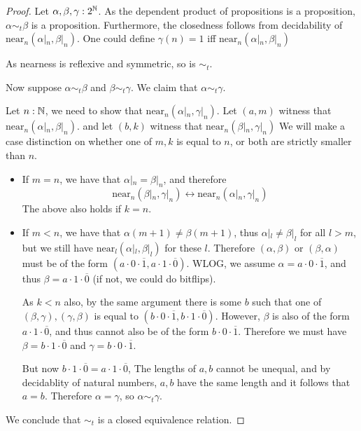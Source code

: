 \begin{proof}
   Let $\alpha, \beta, \gamma : 2^{\mathbb{N}}$. 
   As the dependent product of propositions is a proposition, $\alpha \sim_t\beta$ is a proposition. 
   Furthermore, the closedness follows from decidability of $\text{near}_n(\alpha|_n, \beta|_n)$. 
   One could define $\gamma(n) = 1$ iff $\text{near}_n(\alpha|_n, \beta|_n)$
   
   As nearness is reflexive and symmetric, so is $\sim_t$. 

   Now suppose $\alpha \sim_t \beta$ and $\beta\sim_t \gamma$. 
   We claim that $\alpha \sim_t \gamma$. 

   Let $n:\mathbb{N}$, we need to show that 
   $\text{near}_n(\alpha|_n , \gamma|_n)$. 
   Let $(a,m)$ witness that $\text{near}_n(\alpha|_n, \beta|_n)$.
   and let $(b, k)$ witness that $\text{near}_n(\beta|_n, \gamma|_n)$
   We will make a case distinction on whether one of $m,k$ is equal to $n$, or
   both are strictly smaller than $n$. 
   \begin{itemize}
     \item 
       If $m=n$, we have that $\alpha|_n = \beta|_n$, and therefore 
       \begin{equation}
         \text{near}_n(\beta|_n, \gamma|_n) \leftrightarrow \text{near}_n(\alpha|_n, \gamma|_n)
       \end{equation} 
       The above also holds if $k = n$.
     \item 
       If $m< n$, we have that $\alpha(m+1) \neq \beta(m+1)$, thus 
       $\alpha|_l \neq \beta|_l$ for all $l>m$, 
       but we still have $\text{near}_l(\alpha|_l, \beta|_l)$ for these $l$. 
       Therefore $(\alpha, \beta)$ or $(\beta, \alpha)$ must be of the form
       $(a \cdot 0 \cdot \overline 1, a \cdot 1 \cdot \overline 0)$. 
       WLOG, we assume $\alpha = a \cdot 0 \cdot \overline 1$, and thus 
       $\beta = a \cdot 1 \cdot \overline 0$ (if not, we could do bitflips). 

       As $k<n$ also, by the same argument there is some $b$ such that one of 
       $(\beta,\gamma), (\gamma, \beta)$
       is equal to $(b\cdot 0 \cdot \overline 1, b \cdot 1 \cdot \overline 0)$. 
       However, $\beta$ is also of the form $a \cdot 1 \cdot \overline 0$, and 
       thus cannot also be of the form $b \cdot 0 \cdot \overline 1$. 
       Therefore we must have 
       $\beta = b\cdot 1 \cdot \overline 0$ and 
       $\gamma= b\cdot 0 \cdot \overline 1$. 

       But now $b \cdot 1 \cdot \overline 0 = a \cdot 1 \cdot \overline 0$, 
       The lengths of $a,b$ cannot be unequal, and by decidablity of natural numbers, 
       $a,b$ have the same length and it follows that $ a = b$. 
       Therefore $ \alpha = \gamma$, so $\alpha \sim_t\gamma$.
   \end{itemize}

   We conclude that $\sim_t$ is a closed equivalence relation. 
\end{proof}
